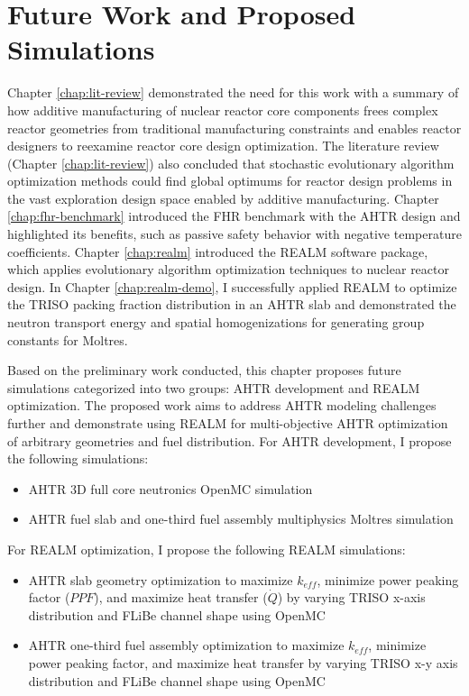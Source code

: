 \chapter{Future Work and Proposed Simulations}

Chapter \ref{chap:lit-review} demonstrated the need for this work with a summary
of how additive manufacturing of nuclear reactor core components frees complex 
reactor geometries from traditional manufacturing constraints and enables 
reactor designers to reexamine reactor core design optimization.
The literature review (Chapter \ref{chap:lit-review}) also concluded that 
stochastic evolutionary algorithm optimization methods could find global 
optimums for reactor design problems in the vast exploration design space 
enabled by additive manufacturing. 
Chapter \ref{chap:fhr-benchmark} introduced the \acrfull{FHR} benchmark with 
the \gls{AHTR} design and highlighted its benefits, such as passive safety 
behavior with negative temperature coefficients. 
Chapter \ref{chap:realm} introduced the \acrfull{REALM} software package, 
which applies evolutionary algorithm optimization techniques to nuclear 
reactor design. 
In Chapter \ref{chap:realm-demo}, I successfully applied \gls{REALM} 
to optimize the \gls{TRISO} packing fraction distribution in an \gls{AHTR} slab
and demonstrated the neutron transport energy and spatial homogenizations for 
generating group constants for Moltres. 

Based on the preliminary work conducted, this chapter proposes 
future simulations categorized into two groups: \gls{AHTR} development and 
\gls{REALM} optimization. 
The proposed work aims to address \gls{AHTR} modeling challenges further and 
demonstrate using \gls{REALM} for multi-objective \gls{AHTR} 
optimization of arbitrary geometries and fuel distribution. 
For \gls{AHTR} development, I propose the following simulations: 
\begin{itemize}
    \item \gls{AHTR} 3D full core neutronics OpenMC simulation
    \item \gls{AHTR} fuel slab and one-third fuel assembly multiphysics 
    Moltres simulation
\end{itemize}
For \gls{REALM} optimization, I propose the following \gls{REALM} simulations: 
\begin{itemize}
    \item \gls{AHTR} slab geometry optimization to maximize $k_{eff}$, 
    minimize power peaking factor ($PPF$), and maximize heat transfer ($\dot{Q}$) by varying \gls{TRISO} 
    x-axis distribution and \gls{FLiBe} channel shape using OpenMC
    \item \gls{AHTR} one-third fuel assembly optimization to maximize $k_{eff}$, 
    minimize power peaking factor, and maximize heat transfer by varying \gls{TRISO} 
    x-y axis distribution and \gls{FLiBe} channel shape using OpenMC
\end{itemize}


